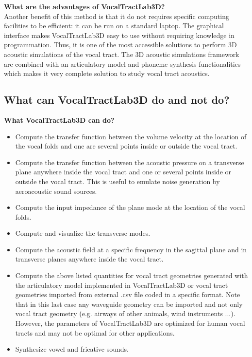 \documentclass[]{article}
\begin{document}
	\textbf{What are the advantages of VocalTractLab3D?}\\
	Another benefit of this method is that it do not requires specific computing facilities
	to be efficient: it can be run on a standard laptop.
	The graphical interface makes VocalTractLab3D easy to use without requiring knowledge 
	in programmation. Thus, it is one of the most accessible solutions to perform 3D acoustic
	simulations of the vocal tract. 
	The 3D acoustic simulations framework are combined with an articulatory model and 
	phoneme synthesis functionalities which makes it very complete solution to study vocal 
	tract acoustics.
	
	\subsection{What can VocalTractLab3D do and not do?}
	
	\textbf{What VocalTractLab3D can do?}
	\begin{itemize}
		\item Compute the transfer function between the volume velocity
		at the location of the vocal folds and one are several points inside or outside the vocal tract.
		\item Compute the transfer function between the acoustic pressure on a transverse plane anywhere inside the vocal tract and one or several points inside or outside the vocal tract.
		This is useful to emulate noise generation by aeroacoustic 
		sound sources.
		\item Compute the input impedance of the plane mode at the 
		location of the vocal folds.
		\item Compute and visualize the transverse modes.
		\item Compute the acoustic field at a specific frequency in the sagittal plane and in transverse planes anywhere inside the vocal tract.
		\item Compute the above listed quantities for vocal tract 
		geometries generated with the articulatory model implemented 
		in VocalTractLab3D or vocal tract geometries imported from 
		external .csv file coded in a specific format. Note that in 
		this last case any waveguide geometry can be imported and not only vocal tract geometry (e.g. airways of other animals, wind instruments ...). However, the parameters of VocalTractLab3D 
		are optimized for human vocal tracts and may not be optimal for
		other applications.
		\item Synthesize vowel and fricative sounds.
	\end{itemize}
\end{document}
